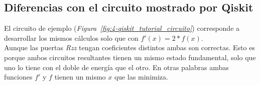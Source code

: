\subsection{Diferencias con el circuito mostrado por Qiskit}

El circuito de ejemplo (\textit{Figura~\ref{fig:4-qiskit_tutorial_circuito}}) corresponde a desarrollar los mismos cálculos solo que con $f'(x) = 2*f(x)$. \\
Aunque las puertas \textit{Rzz} tengan coeficientes distintos ambas son correctas. Esto es porque ambos circuitos resultantes tienen un mismo estado fundamental, solo que uno lo tiene con el doble de energía que el otro. En otras palabras ambas funciones $f'$ y $f$ tienen un mismo $x$ que las minimiza.


